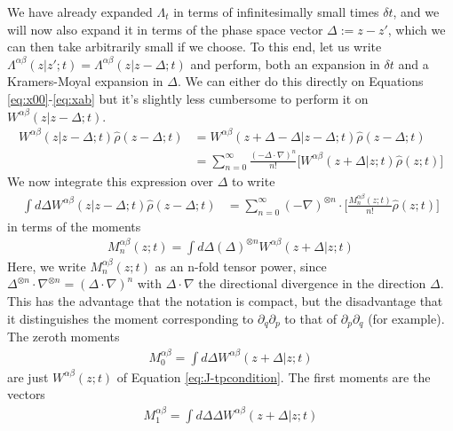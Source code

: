 \documentclass[aps,pra,showpacs,citeautoscript,amsmath,amssymb,floatfix,superscriptaddress,bbm, verbatim,amsfonts,changes,11pt,nofootinbib,longbibliography]{revtex4-2}
\def\X{\Lambda}
\def\z{{z}}
\def\dist{{\Delta}}
\def\ddist{{d\!\dist}}
\def\dt{\delta t}
\def\rate{{W}}
\def\ab{^{\alpha\beta}}
\newcommand{\M}[1]{M_{#1}\ab}
\renewcommand{\varrho}{\hat{\rho}}
\def\psiz{{\varrho(\z;t)}}
\def\psizd{{\varrho(\z-\dist;t)}}
\begin{document}
We have already expanded $\X_t$ in terms of infinitesimally small times $\dt$, and we will now also expand it in terms of the phase space vector $\dist:=\z-\z'$, which we can then take arbitrarily small if we choose.  
To this end, let us write $\X^{\alpha\beta}(\z|\z';t)=\X^{\alpha\beta}(\z|\z-\dist;t)$ 
and perform, both an expansion in $\dt$ and a Kramers-Moyal expansion \cite{kramers1940brownian,moyal1949stochastic} in $\dist$. We can either do this directly on
Equations \eqref{eq:x00}-\eqref{eq:xab} but it's slightly less cumbersome to perform it on $\rate^{\alpha\beta}(\z|\z-\dist;t)$.
\begin{align}
\rate^{\alpha\beta}(\z|\z-\dist;t)\psizd
&=\rate^{\alpha\beta}(\z+\dist-\dist|\z-\dist;t)\psizd
\nonumber\\
&=\sum_{n=0}^\infty\frac{(-\dist\cdot\nabla)^n}{n!}\big[\rate^{\alpha\beta}(\z+\dist|\z;t)\psiz\big]
\end{align}
We now integrate this expression over $\dist$ to write
\begin{align}
\int \ddist\rate^{\alpha\beta}(\z|\z-\dist;t)\psizd
&=\sum_{n=0}^\infty(-\nabla)^{\otimes n}\cdot\big[\frac{\M{n}(\z;t)}{n!}\psiz\big]
\end{align}
in terms of the moments
\begin{align}
{\M{n}(\z;t)}=\int\ddist (\dist)^{\otimes n} \rate^{\alpha\beta}(\z+\dist|\z;t)
\label{eq:momentdef}
\end{align}
Here, we write $\M{n}(\z;t)$ as an n-fold tensor power, since $\dist^{\otimes n}\cdot\nabla^{\otimes n}=(\dist\cdot\nabla)^n$ with $\dist\cdot\nabla$ the directional divergence in the direction $\dist$. This has the advantage that the notation is compact, but the disadvantage that it distinguishes the moment corresponding to $\partial_q\partial_p$ to that of $\partial_p\partial_q$ (for example).
The zeroth moments
\begin{align}
\M{0}=\int\ddist W\ab(\z+\dist|\z;t)
\label{eq:zeroeth}
\end{align}
are just $W\ab(\z;t)$ of Equation \eqref{eq:J-tpcondition}. The first moments are the vectors
\begin{align}
\M{1}=\int\ddist \dist W\ab(\z+\dist|\z;t)
\end{align}
\end{document}
